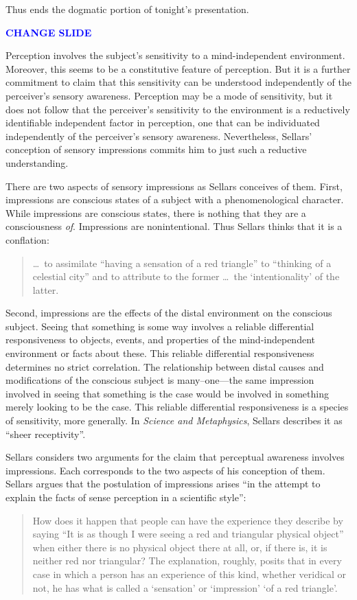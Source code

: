 \documentclass[12pt]{article}
\newcommand{\change}{\textcolor{blue}{\textbf{CHANGE SLIDE}}}
\begin{document}
Thus ends the dogmatic portion of tonight's presentation.

\change

Perception involves the subject's sensitivity to a mind-independent environment. Moreover, this seems to be a constitutive feature of perception. But it is a further commitment to claim that this sensitivity can be understood independently of the perceiver's sensory awareness. Perception may be a mode of sensitivity, but it does not follow that the perceiver's sensitivity to the environment is a reductively identifiable independent factor in perception, one that can be individuated independently of the perceiver's sensory awareness. Nevertheless, Sellars' conception of sensory impressions commits him to just such a reductive understanding.

There are two aspects of sensory impressions as Sellars conceives of them. First, impressions are conscious states of a subject with a phenomenological character. While impressions are conscious states, there is nothing that they are a consciousness \emph{of}. Impressions are nonintentional. Thus Sellars thinks that it is a conflation:
\begin{quote}
    \ldots\ to assimilate ``having a sensation of a red triangle'' to ``thinking of a celestial city'' and to attribute to the former \ldots\ the `intentionality' of the latter.
\end{quote}
Second, impressions are the effects of the distal environment on the conscious subject. Seeing that something is some way involves a reliable differential responsiveness to objects, events, and properties of the mind-independent environment or facts about these. This reliable differential responsiveness determines no strict correlation. The relationship between distal causes and modifications of the conscious subject is many--one---the same impression involved in seeing that something is the case would be involved in something merely looking to be the case. This reliable differential responsiveness is a species of sensitivity, more generally. In \emph{Science and Metaphysics}, Sellars describes it as ``sheer receptivity''.

Sellars considers two arguments for the claim that perceptual awareness involves impressions. Each corresponds to the two aspects of his conception of them. Sellars argues that the postulation of impressions arises ``in the attempt to explain the facts of sense perception in a scientific style'':
\begin{quote}
    How does it happen that people can have the experience they describe by saying ``It is as though I were seeing a red and triangular physical object'' when either there is no physical object there at all, or, if there is, it is neither red nor triangular? The explanation, roughly, posits that in every case in which a person has an experience of this kind, whether veridical or not, he has what is called a `sensation' or `impression' `of a red triangle'.
\end{quote}
\end{document}
